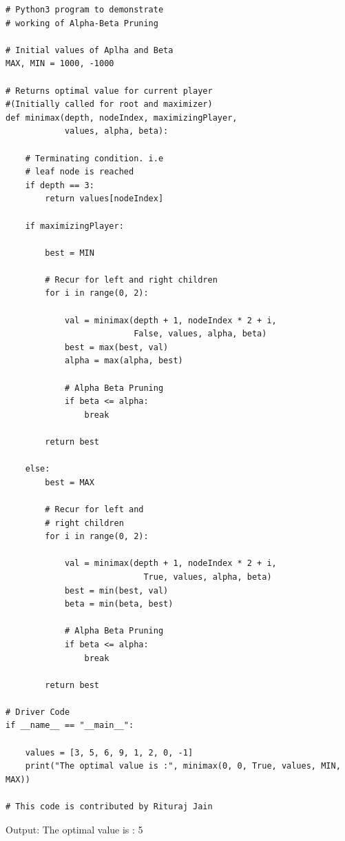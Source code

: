 \documentclass[uplatex,a4paper,11pt,oneside,openany]{jsbook}
\begin{document}
\begin{lstlisting}[caption=minimax004,label=prog001-4]
# Python3 program to demonstrate
# working of Alpha-Beta Pruning

# Initial values of Aplha and Beta
MAX, MIN = 1000, -1000

# Returns optimal value for current player
#(Initially called for root and maximizer)
def minimax(depth, nodeIndex, maximizingPlayer,
            values, alpha, beta):

    # Terminating condition. i.e
    # leaf node is reached
    if depth == 3:
        return values[nodeIndex]

    if maximizingPlayer:

        best = MIN

        # Recur for left and right children
        for i in range(0, 2):

            val = minimax(depth + 1, nodeIndex * 2 + i,
                          False, values, alpha, beta)
            best = max(best, val)
            alpha = max(alpha, best)

            # Alpha Beta Pruning
            if beta <= alpha:
                break

        return best

    else:
        best = MAX

        # Recur for left and
        # right children
        for i in range(0, 2):

            val = minimax(depth + 1, nodeIndex * 2 + i,
                            True, values, alpha, beta)
            best = min(best, val)
            beta = min(beta, best)

            # Alpha Beta Pruning
            if beta <= alpha:
                break

        return best

# Driver Code
if __name__ == "__main__":

    values = [3, 5, 6, 9, 1, 2, 0, -1]
    print("The optimal value is :", minimax(0, 0, True, values, MIN, MAX))

# This code is contributed by Rituraj Jain
\end{lstlisting}

\begin{itembox}[l]{Output:}
The optimal value is : 5
\end{itembox}
\end{document}
